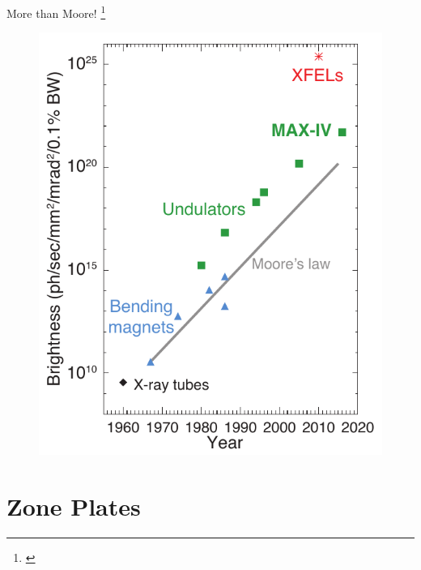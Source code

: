 \documentclass{beamer}
\begin{document}
\begin{frame}{More than Moore! \footnote{\cite{synchrotron}}}
		\begin{center}
		\begin{figure}
			\includegraphics[scale=0.55]{xray}
		\end{figure}
		\end{center}	
\end{frame}


\section{Zone Plates}
\end{document}
